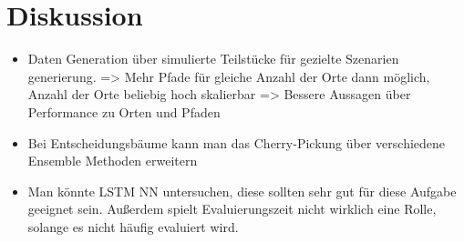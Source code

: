 \chapter{Diskussion}
\begin{itemize}
    \item Daten Generation über simulierte Teilstücke für gezielte Szenarien generierung. => Mehr Pfade für gleiche Anzahl der Orte dann möglich,
          Anzahl der Orte beliebig hoch skalierbar => Bessere Aussagen über Performance zu Orten und Pfaden
    \item Bei Entscheidungsbäume kann man das Cherry-Pickung über verschiedene Ensemble Methoden erweitern
    \item Man könnte LSTM NN untersuchen, diese sollten sehr gut für diese Aufgabe geeignet sein. Außerdem spielt Evaluierungszeit nicht wirklich eine Rolle, solange es nicht häufig evaluiert wird.
\end{itemize}